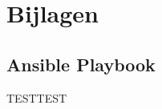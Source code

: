 

\chapter*{Bijlagen}
\label{ch:bijlagen}

\setcounter{section}{0}
\renewcommand\thesection{\Alph{section}}

\section{Ansible Playbook}
\label{ch:ansibleplaybookannex}

TESTTEST